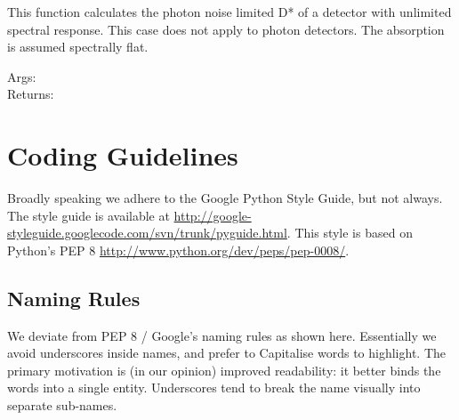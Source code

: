 \documentclass[a4paper,10pt,english]{sphinxmanual}
\begin{document}
\begin{fulllineitems}
\label{rydetector:pyradi.rydetector.DstarSpectralFlatPhotonLim}
This function calculates the photon noise limited D* of a detector with
unlimited spectral response. This case does not apply to photon detectors.
The absorption is assumed spectrally flat.
\begin{description}
\item[{Args:}] \leavevmode
{}

\item[{Returns:}] \leavevmode
{}

\end{description}

\end{fulllineitems}



\chapter{Coding Guidelines}
\label{codingguidelines::doc}\label{codingguidelines:coding-guidelines}
Broadly speaking we adhere to the Google Python Style Guide, but not always.
The style guide is available at
\href{http://google-styleguide.googlecode.com/svn/trunk/pyguide.html}{http://google-styleguide.googlecode.com/svn/trunk/pyguide.html}. This style is
based on Python's PEP 8 \href{http://www.python.org/dev/peps/pep-0008/}{http://www.python.org/dev/peps/pep-0008/}.


\section{Naming Rules}
\label{codingguidelines:naming-rules}
We deviate from PEP 8 / Google's naming rules as shown here. Essentially we avoid
underscores inside names, and prefer to Capitalise words to highlight.  The primary
motivation is (in our opinion) improved readability: it better binds the words
into a single entity. Underscores tend to break the name visually into separate
sub-names.
\end{document}
